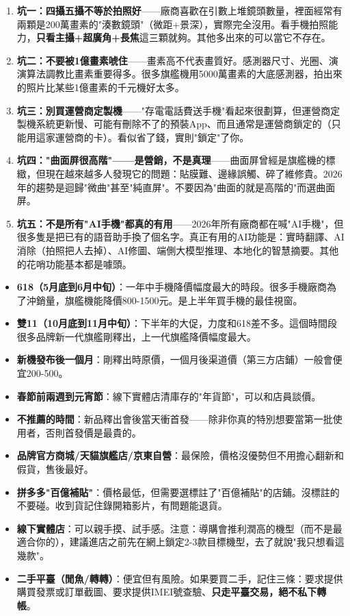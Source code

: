 \begin{enumerate}
  \item \textbf{坑一：四攝五攝不等於拍照好}——廠商喜歡在引數上堆鏡頭數量，裡面經常有兩顆是200萬畫素的"湊數鏡頭"（微距+景深），實際完全沒用。看手機拍照能力，\textbf{只看主攝+超廣角+長焦}這三顆就夠。其他多出來的可以當它不存在。
  \item \textbf{坑二：不要被1億畫素唬住}——畫素高不代表畫質好。感測器尺寸、光圈、演演算法調教比畫素重要得多。很多旗艦機用5000萬畫素的大底感測器，拍出來的照片比某些1億畫素的千元機好太多。
  \item \textbf{坑三：別買運營商定製機}——"存電電話費送手機"看起來很劃算，但運營商定製機系統更新慢、可能有刪除不了的預裝App、而且通常是運營商鎖定的（只能用這家運營商的卡）。看似省了錢，實則"鎖定"了你。
  \item \textbf{坑四："曲面屏很高階"——是營銷，不是真理}——曲面屏曾經是旗艦機的標緻，但現在越來越多人發現它的問題：貼膜難、邊緣誤觸、碎了維修貴。2026年的趨勢是迴歸"微曲"甚至"純直屏"。不要因為"曲面的就是高階的"而選曲面屏。
  \item \textbf{坑五：不是所有"AI手機"都真的有用}——2026年所有廠商都在喊"AI手機"，但很多隻是把已有的語音助手換了個名字。真正有用的AI功能是：實時翻譯、AI消除（拍照把人去掉）、AI修圖、端側大模型推理、本地化的智慧摘要。其他的花哨功能基本都是噱頭。
\end{enumerate}


\begin{itemize}
  \item \textbf{618（5月底到6月中旬）}：一年中手機降價幅度最大的時段。很多手機廠商為了沖銷量，旗艦機能降價800-1500元。是上半年買手機的最佳視窗。
  \item \textbf{雙11（10月底到11月中旬）}：下半年的大促，力度和618差不多。這個時間段很多品牌新一代旗艦剛釋出，上一代旗艦降價幅度最大。
  \item \textbf{新機發布後一個月}：剛釋出時原價，一個月後渠道價（第三方店鋪）一般會便宜200-500。
  \item \textbf{春節前兩週到元宵節}：線下實體店清庫存的"年貨節"，可以和店員談價。
  \item \textbf{不推薦的時間}：新品釋出會後當天衝首發——除非你真的特別想要當第一批使用者，否則首發價是最貴的。
\end{itemize}


\begin{itemize}
  \item \textbf{品牌官方商城/天貓旗艦店/京東自營}：最保險，價格沒優勢但不用擔心翻新和假貨，售後最好。
  \item \textbf{拼多多"百億補貼"}：價格最低，但需要選標註了"百億補貼"的店鋪。沒標註的不要碰。收到貨記住錄開箱影片，有問題能退貨。
  \item \textbf{線下實體店}：可以親手摸、試手感。注意：導購會推利潤高的機型（而不是最適合你的），建議進店之前先在網上鎖定2-3款目標機型，去了就說"我只想看這幾款"。
  \item \textbf{二手平臺（閒魚/轉轉）}：便宜但有風險。如果要買二手，記住三條：要求提供購買發票或訂單截圖、要求提供IMEI號查驗、\textbf{只走平臺交易，絕不私下轉帳}。
\end{itemize}

